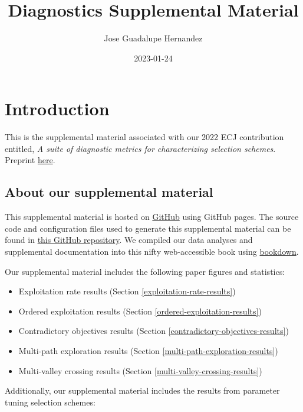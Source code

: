 \documentclass[]{book}
\title{Diagnostics Supplemental Material}
\author{Jose Guadalupe Hernandez}
\date{2023-01-24}
\providecommand{\tightlist}{%
  \setlength{\itemsep}{0pt}\setlength{\parskip}{0pt}}
\begin{document}
\maketitle

{
\setcounter{tocdepth}{1}
\tableofcontents
}
\hypertarget{introduction}{%
\chapter{Introduction}\label{introduction}}

This is the supplemental material associated with our 2022 ECJ contribution entitled, \emph{A suite of diagnostic metrics for characterizing selection schemes}.
Preprint \href{https://arxiv.org/pdf/2204.13839.pdf}{here}.

\hypertarget{about-our-supplemental-material}{%
\section{About our supplemental material}\label{about-our-supplemental-material}}

This supplemental material is hosted on \href{https://github.com}{GitHub} using GitHub pages.
The source code and configuration files used to generate this supplemental material can be found in \href{https://github.com/jgh9094/ECJ-2022-suite-of-diagnostics-for-selection-schemes}{this GitHub repository}.
We compiled our data analyses and supplemental documentation into this nifty web-accessible book using \href{https://bookdown.org/}{bookdown}.

Our supplemental material includes the following paper figures and statistics:

\begin{itemize}
\tightlist
\item
  Exploitation rate results (Section \ref{exploitation-rate-results})
\item
  Ordered exploitation results (Section \ref{ordered-exploitation-results})
\item
  Contradictory objectives results (Section \ref{contradictory-objectives-results})
\item
  Multi-path exploration results (Section \ref{multi-path-exploration-results})
\item
  Multi-valley crossing results (Section \ref{multi-valley-crossing-results})
\end{itemize}

Additionally, our supplemental material includes the results from parameter tuning selection schemes:
\end{document}
